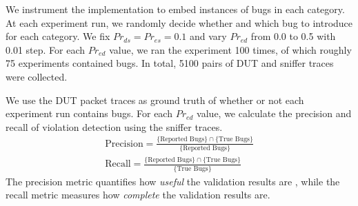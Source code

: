 We instrument the \ns{} implementation to embed instances of bugs in each
category. At each experiment run, we randomly decide whether and which bug to
introduce for each category. We fix $Pr_{ds}=Pr_{es}=0.1$ and vary $Pr_{ed}$
from 0.0 to 0.5 with 0.01 step. For each $Pr_{ed}$ value, we ran the experiment
100 times, of which roughly 75 experiments contained bugs. In total, 5100 pairs of
DUT and sniffer traces were collected.


We use the DUT packet traces as ground truth of whether or not each experiment
run contains bugs.
For each $Pr_{ed}$ value, we calculate the precision and recall of violation
detection using the sniffer traces.%
\begin{align}
  \text{Precision} = \frac{\{\text{Reported Bugs}\} \cap \{\text{True Bugs}\}}{\{\text{Reported Bugs}\}}\\
  \text{Recall} = \frac{\{\text{Reported Bugs}\} \cap \{\text{True Bugs}\}}{\{\text{True Bugs}\}}
\end{align}%
The precision metric quantifies how \textit{useful} the validation results are ,
while the recall metric measures how \textit{complete} the validation results
are.

